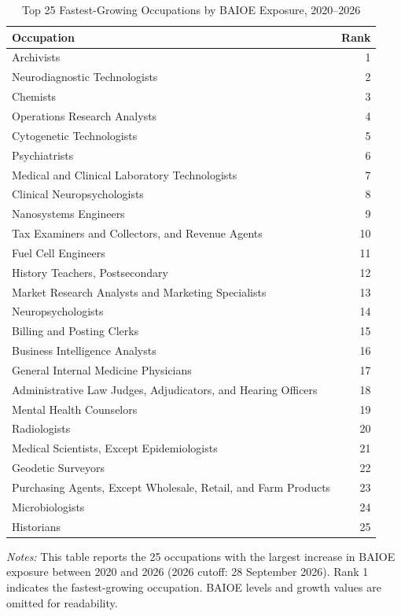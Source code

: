 \begin{table}[htbp]\centering
\caption{Top 25 Fastest-Growing Occupations by BAIOE Exposure, 2020--2026}\label{tab:table_fastest25_2020_2026}
\begin{tabular}{lr}\toprule
Occupation & Rank \\ \midrule
Archivists & 1 \\
Neurodiagnostic Technologists & 2 \\
Chemists & 3 \\
Operations Research Analysts & 4 \\
Cytogenetic Technologists & 5 \\
Psychiatrists & 6 \\
Medical and Clinical Laboratory Technologists & 7 \\
Clinical Neuropsychologists & 8 \\
Nanosystems Engineers & 9 \\
Tax Examiners and Collectors, and Revenue Agents & 10 \\
Fuel Cell Engineers & 11 \\
History Teachers, Postsecondary & 12 \\
Market Research Analysts and Marketing Specialists & 13 \\
Neuropsychologists & 14 \\
Billing and Posting Clerks & 15 \\
Business Intelligence Analysts & 16 \\
General Internal Medicine Physicians & 17 \\
Administrative Law Judges, Adjudicators, and Hearing Officers & 18 \\
Mental Health Counselors & 19 \\
Radiologists & 20 \\
Medical Scientists, Except Epidemiologists & 21 \\
Geodetic Surveyors & 22 \\
Purchasing Agents, Except Wholesale, Retail, and Farm Products & 23 \\
Microbiologists & 24 \\
Historians & 25 \\
\bottomrule\end{tabular}
\begin{minipage}{0.95\linewidth}\footnotesize \textit{Notes:} This table reports the 25 occupations with the largest increase in BAIOE exposure between 2020 and 2026 (2026 cutoff: 28 September 2026). Rank 1 indicates the fastest-growing occupation. BAIOE levels and growth values are omitted for readability.\end{minipage}
\end{table}

